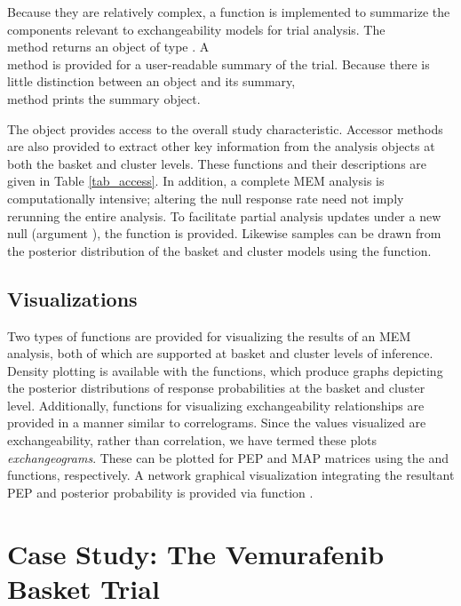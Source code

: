 Because they are relatively complex, a  function is implemented to summarize the components relevant to exchangeability models for trial analysis. The \\
 method returns an object of type . A \\  method is provided for a user-readable summary of the trial. Because there is little distinction between an  object and its summary, \\  method prints the summary object.


The  object provides access to the overall study characteristic. Accessor methods are also provided to extract other key information from the analysis objects at both the basket and cluster levels. These functions and their descriptions are given in Table \ref{tab_access}.
In addition, a complete MEM analysis is computationally intensive; altering the null response rate need not imply rerunning the entire analysis. To facilitate  partial analysis updates under a new null (argument ), the  function is provided. Likewise samples can be drawn from the posterior distribution of the basket and cluster models using the  function.

\subsection{Visualizations}

Two types of functions are provided for visualizing the results of an MEM analysis, both of which are supported at basket and cluster levels of inference. Density plotting is available with the  functions, which produce graphs depicting the posterior distributions of response probabilities at the basket and cluster level. Additionally, functions for visualizing exchangeability relationships are provided in a manner similar to correlograms. Since the values visualized are exchangeability, rather than correlation, we have termed these plots {\em exchangeograms}. These can be plotted for PEP and MAP matrices using the  and  functions, respectively. A network graphical visualization integrating the resultant PEP and posterior probability is provided via function .


\section{Case Study: The Vemurafenib Basket Trial}


